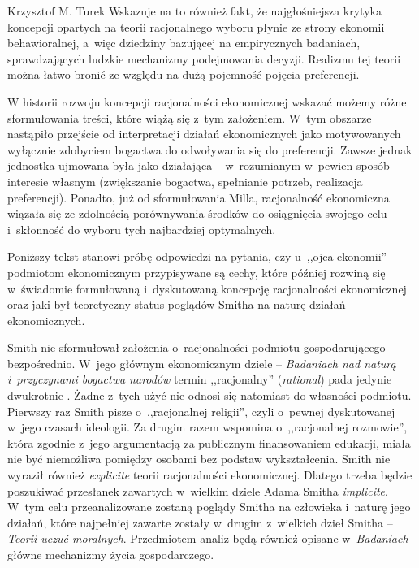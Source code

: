 \begin{artplenv}{Krzysztof M. Turek}
Wskazuje na to również fakt, że najgłośniejsza krytyka koncepcji opartych na teorii racjonalnego wyboru płynie ze strony
ekonomii behawioralnej, a~więc dziedziny bazującej na empirycznych badaniach, sprawdzających ludzkie mechanizmy
podejmowania decyzji. Realizmu tej teorii można łatwo bronić ze względu na dużą pojemność pojęcia preferencji.

W historii rozwoju koncepcji racjonalności ekonomicznej wskazać możemy różne sformułowania treści, które wiążą się z~tym
założeniem. W~tym obszarze nastąpiło przejście od interpretacji działań ekonomicznych jako motywowanych wyłącznie
zdobyciem bogactwa do odwoływania się do preferencji. Zawsze jednak jednostka ujmowana była jako
działająca -- w~rozumianym w~pewien sposób -- interesie własnym (zwiększanie bogactwa, spełnianie potrzeb,
realizacja preferencji).
Ponadto, już od sformułowania Milla, racjonalność ekonomiczna wiązała się ze zdolnością porównywania środków do
osiągnięcia swojego celu i~skłonność do wyboru tych najbardziej optymalnych. 

Poniższy tekst stanowi próbę odpowiedzi na pytania, czy u~,,ojca ekonomii'' podmiotom ekonomicznym przypisywane są cechy,
które później rozwiną się w~świadomie formułowaną i~dyskutowaną koncepcję racjonalności ekonomicznej oraz jaki był
teoretyczny status poglądów Smitha na naturę działań ekonomicznych.

Smith nie sformułował założenia o~racjonalności podmiotu gospodarującego bezpośrednio. W~jego głównym ekonomicznym
dziele -- \textit{Badaniach nad naturą i~przyczynami bogactwa narodów }termin ,,racjonalny'' (\textit{rational}) pada
jedynie dwukrotnie
\parencite[s.~603 i~612]{smith_inquiry_2007}.
Żadne z~tych użyć nie odnosi się natomiast do
własności podmiotu. Pierwszy raz Smith pisze o~,,racjonalnej religii'', czyli o~pewnej dyskutowanej w~jego czasach
ideologii. Za drugim razem wspomina o~,,racjonalnej rozmowie'', która zgodnie z~jego argumentacją za publicznym
finansowaniem edukacji, miała nie być niemożliwa pomiędzy osobami bez podstaw wykształcenia. Smith nie wyraził również
\textit{explicite }teorii racjonalności ekonomicznej. Dlatego trzeba będzie poszukiwać przesłanek zawartych w~wielkim
dziele Adama Smitha \textit{implicite}. W~tym celu przeanalizowane zostaną poglądy Smitha na człowieka i~naturę jego
działań, które najpełniej zawarte zostały w~drugim z~wielkich dzieł Smitha -- \textit{Teorii uczuć moralnych}.
Przedmiotem analiz będą również opisane w~\textit{Badaniach }główne mechanizmy życia gospodarczego.


\end{artplenv}
